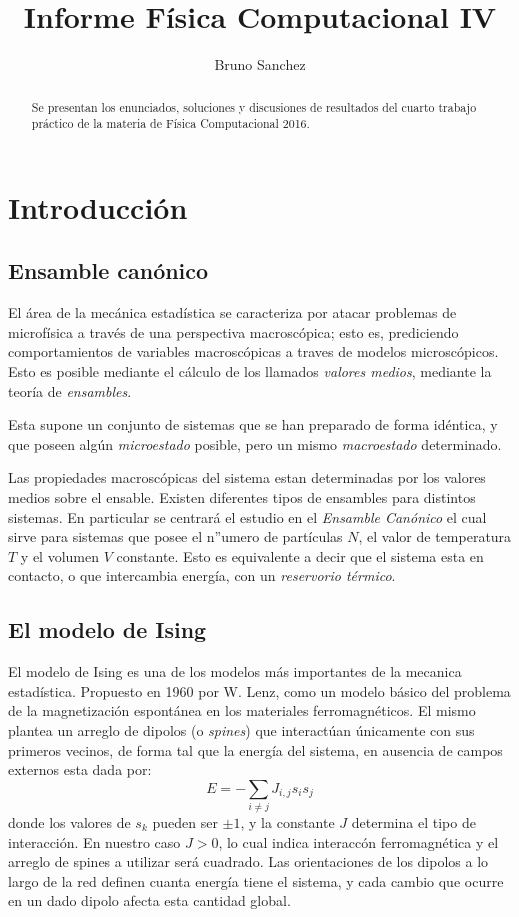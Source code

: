 \documentclass[a4paper,10pt]{paper}
\title{Informe F\'isica Computacional IV}
\author{Bruno Sanchez}
\begin{document}
\maketitle

\begin{abstract}
Se presentan los enunciados, soluciones y discusiones de resultados del cuarto trabajo pr\'actico
de la materia de F\'{i}sica Computacional 2016.
\end{abstract}

\section{Introducci\'on}
\subsection{Ensamble can\'onico}
El \'area de la mec\'anica estad\'istica se caracteriza por atacar problemas de microf\'isica a trav\'es
de una perspectiva macrosc\'opica; esto es, prediciendo comportamientos de variables
macrosc\'opicas a traves de modelos microsc\'opicos.
Esto es posible mediante el c\'alculo de los llamados \textit{valores medios}, mediante la teor\'ia de \textit{ensambles}.

Esta supone un conjunto de sistemas que se han preparado de forma id\'entica, y que poseen alg\'un \textit{microestado}
posible, pero un mismo \textit{macroestado} determinado.

Las propiedades macrosc\'opicas del sistema estan determinadas por los valores medios sobre el ensable.
Existen diferentes tipos de ensambles para distintos sistemas.
En particular se centrar\'a el estudio en el \textit{Ensamble Can\'onico} el cual sirve para sistemas que 
posee el n''umero de part\'iculas $N$, el valor de temperatura $T$ y el volumen $V$ constante.
Esto es equivalente a decir que el sistema esta en contacto, o que intercambia energ\'ia, con un 
\textit{reservorio t\'ermico}.

\subsection{El modelo de Ising}
El modelo de Ising es una de los modelos m\'as importantes de la mecanica estad\'istica. Propuesto
en 1960 por W. Lenz, como un modelo b\'asico del problema de la magnetizaci\'on espont\'anea
en los materiales ferromagn\'eticos. El mismo plantea un arreglo de dipolos (o \textit{spines}) que interact\'uan
\'unicamente con sus primeros vecinos, de forma tal que la energ\'ia del sistema, en ausencia de 
campos externos esta dada por:
\begin{displaymath}
 E = - \sum\limits_{i\neq j}J_{i,j} s_i s_j 
\end{displaymath}
 donde los valores de $s_k$ pueden ser $\pm1$, y la constante $J$ determina el tipo de interacci\'on.
 En nuestro caso $J>0$, lo cual indica interacc\'on ferromagn\'etica y el arreglo de spines a utilizar ser\'a cuadrado.
 Las orientaciones de los dipolos a lo largo de la red definen cuanta energ\'ia tiene el sistema, 
 y cada cambio que ocurre en un dado dipolo afecta esta cantidad global.
\end{document}
